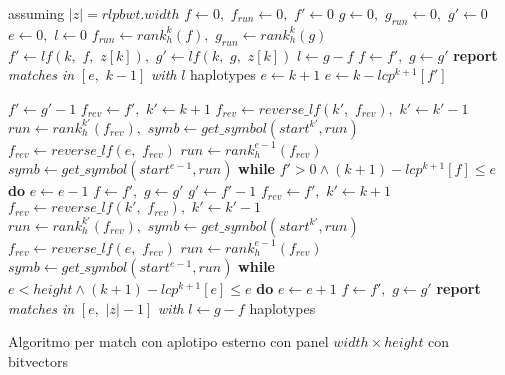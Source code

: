 \begin{algorithm}
  \footnotesize
  \begin{algorithmic}[1]
    \Comment assuming $|z|=rlpbwt.width$
    \State $f\gets 0,\,\,f_{run}\gets 0,\,\,f'\gets 0$
    \State $g\gets 0,\,\,g_{run}\gets 0,\,\,g'\gets 0$
    \State $e\gets 0,\,\,l\gets 0$
    \For {\textit{every} $k\in\left[0,\,\, |z|\right)$}
    \State $f_{run}\gets rank_h^k(f),\,\,g_{run}\gets rank_h^k(g)$
    \State $f'\gets lf(k,\,\, f,\,\, z[k]),\,\,g'\gets lf(k,\,\, g,\,\, z[k])$
    \State $l\gets g-f$
    \State $f\gets f',\,\,g\gets g'$
    \Else
    \State \textbf{report} \textit{matches in} $[e,\,\, k-1]$ \textit{with} $l$
    haplotypes   
    \EndIf
    \State $e\gets k+1$
    \Else
    \State $e\gets k-lcp^{k+1}[f']$
    \EndIf
    
    \State $f'\gets g'-1$
    \State $f_{rev}\gets f',\,\,k'\gets k+1$
    \State $f_{rev}\gets reverse\_lf(k', \,\,f_{rev}),\,\,k'\gets k'-1$
    \EndWhile
    \State $run\gets rank_h^{k'}(f_{rev}),\,\,symb\gets get\_symbol(start^{k'},
    run)$ 
    \State $f_{rev}\gets reverse\_lf(e, \,\,f_{rev})$
    \State $run\gets rank_h^{e-1}(f_{rev})$
    \State $symb\gets get\_symbol(start^{e-1}, run)$
    \EndWhile
    \EndIf
    \State \textbf{while} $f'>0\land (k+1)-lcp^{k+1}[f]\leq e$ \textbf{do}
    $e\gets e-1$ 
    \State $f\gets f',\,\,g\gets g'$
    \Else
    \State $g'\gets f'-1$
    \State $f_{rev}\gets f',\,\,k'\gets k+1$
    \State $f_{rev}\gets reverse\_lf(k', \,\,f_{rev}),\,\,k'\gets k'-1$
    \EndWhile
    \State $run\gets rank_h^{k'}(f_{rev}),\,\,symb\gets get\_symbol(start^{k'},
    run)$ 
    \State $f_{rev}\gets reverse\_lf(e, \,\,f_{rev})$
    \State $run\gets rank_h^{e-1}(f_{rev})$
    \State $symb\gets get\_symbol(start^{e-1}, run)$
    \EndWhile
    \EndIf
    \State \textbf{while} $e<height\land (k+1)-lcp^{k+1}[e]\leq e$ \textbf{do}
    $e\gets e+1$  
    \State $f\gets f',\,\,g\gets g'$
    \EndIf
    \EndIf
    \EndFor
    \State \textbf{report} \textit{matches in} $[e,\,\, |z|-1]$ \textit{with}
    $l\gets g-f$ haplotypes   
    \EndIf
    \EndFunction
  \end{algorithmic}
  \caption{Algoritmo per match con aplotipo esterno con panel $width\times
  height$ con bitvectors}
  \label{algo:matchpanelbv}
\end{algorithm}

